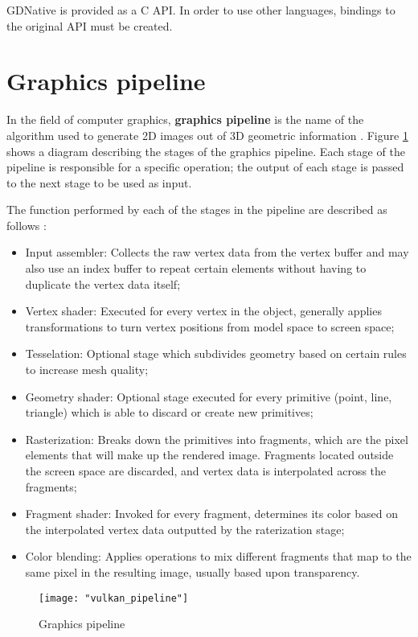 GDNative is provided as a C API. In order to use other languages, bindings to the original API must be created.

\section{Graphics pipeline}
In the field of computer graphics, \textbf{graphics pipeline} is the name of the algorithm used to generate 2D images out of 3D geometric information \cite{shirley_fcg:2002}. Figure \ref{fig:graphics_pipeline} shows a diagram describing the stages of the graphics pipeline. Each stage of the pipeline is responsible for a specific operation; the output of each stage is passed to the next stage to be used as input.

The function performed by each of the stages in the pipeline are described as follows \cite{vulkan_tutorial}:

\begin{itemize}
    \item Input assembler: Collects the raw vertex data from the vertex buffer and may also use an index buffer to repeat certain elements without having to duplicate the vertex data itself;
    \item Vertex shader: Executed for every vertex in the object, generally applies transformations to turn vertex positions from model space to screen space;
    \item Tesselation: Optional stage which subdivides geometry based on certain rules to increase mesh quality;
    \item Geometry shader: Optional stage executed for every primitive (point, line, triangle) which is able to discard or create new primitives;
    \item Rasterization: Breaks down the primitives into fragments, which are the pixel elements that will make up the rendered image. Fragments located outside the screen space are discarded, and vertex data is interpolated across the fragments;
    \item Fragment shader: Invoked for every fragment, determines its color based on the interpolated vertex data outputted by the raterization stage;
    \item Color blending: Applies operations to mix different fragments that map to the same pixel in the resulting image, usually based upon transparency.
\end{itemize}

\begin{figure}[h]
    \caption{Graphics pipeline}
    \begin{center}
        \texttt{[image: "vulkan\_pipeline"]}
    \end{center}
    \label{fig:graphics_pipeline}
\end{figure}

